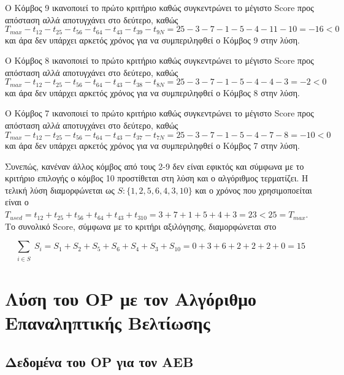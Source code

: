 \documentclass[12pt, a4paper]{article}
\begin{document}
Ο Κόμβος 9 ικανοποιεί το πρώτο κριτήριο καθώς συγκεντρώνει το μέγιστο Score προς απόσταση αλλά αποτυγχάνει στο δεύτερο, καθώς  \( T_{max} -t_{12} - t_{25} - t_{56}  - t_{64} - t_{43} - t_{39} - t_{9N} = 25 - 3 - 7 - 1 - 5 - 4  - 11 - 10 = -16 < 0\) και άρα δεν υπάρχει αρκετός χρόνος για να συμπεριληφθεί ο Κόμβος 9 στην λύση. 

Ο Κόμβος 8 ικανοποιεί το πρώτο κριτήριο καθώς συγκεντρώνει το μέγιστο Score προς απόσταση αλλά αποτυγχάνει στο δεύτερο, καθώς  \( T_{max} -t_{12} - t_{25} - t_{56}  - t_{64} - t_{43} - t_{38} - t_{8N} = 25 - 3 - 7 - 1 - 5 - 4  - 4 - 3 = -2 < 0\) και άρα δεν υπάρχει αρκετός χρόνος για να συμπεριληφθεί ο Κόμβος 8 στην λύση. 

Ο Κόμβος 7 ικανοποιεί το πρώτο κριτήριο καθώς συγκεντρώνει το μέγιστο Score προς απόσταση αλλά αποτυγχάνει στο δεύτερο, καθώς  \( T_{max} -t_{12} - t_{25} - t_{56}  - t_{64} - t_{43} - t_{37} - t_{7N} = 25 - 3 - 7 - 1 - 5 - 4  - 7 - 8 = -10 < 0\) και άρα δεν υπάρχει αρκετός χρόνος για να συμπεριληφθεί ο Κόμβος 7 στην λύση.

Συνεπώς, κανέναν άλλος κόμβος από τους 2-9 δεν είναι εφικτός και σύμφωνα με το κριτήριο επιλογής ο κόμβος 10 προστίθεται στη λύση και ο αλγόριθμος τερματίζει. Η τελική λύση διαμορφώνεται ως \( S: \{1,2,5,6,4,3,10\}\) και ο χρόνος που χρησιμοποείται είναι ο \(T_{used} = t_{12} + t_{25} + t_{56} + t_{64} + t_{43} + t_{310} = 3 + 7 + 1 + 5 + 4 + 3 = 23 < 25 =  T_{max} \). Το συνολικό Score, σύμφωνα με το κριτήρι αξιλόγησης, διαμορφώνεται στο

\begin{equation}
 \sum_{\substack{
		 i \in S}}
	S_i = S_1 + S_2 + S_5 + S_6 + S_4 + S_3 + S_{10} = 0 + 3 + 6 + 2 + 2 + 2 + 0 = 15
\end{equation}


\section{Λύση του OP με τον Αλγόριθμο Επαναληπτικής Βελτίωσης}

\subsection{Δεδομένα του OP για τον ΑΕΒ}
\end{document}
